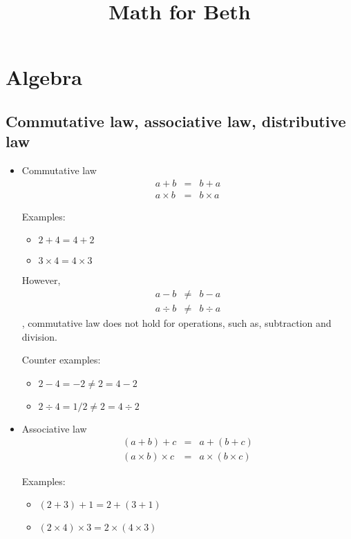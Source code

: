 \documentclass[12pt]{article}   	%
\title{Math for Beth}
\begin{document}
\maketitle



\section{Algebra}

\subsection{Commutative law, associative law, distributive law}

\begin{itemize}
\item Commutative law
\begin{eqnarray*}
a + b &=& b + a
\\
a \times b &=& b \times a
\end{eqnarray*}

Examples:
\begin{itemize}
\item $2 + 4 = 4 + 2$
\item $3 \times 4 = 4 \times 3$
\end{itemize}

However,
\begin{eqnarray*}
a - b &\neq& b - a
\\
a \div b &\neq& b \div a
\end{eqnarray*}
\ie, commutative law does not hold for operations, such as, subtraction and division.

Counter examples:
\begin{itemize}
\item $ 2 - 4 = -2 \neq 2 = 4 - 2 $
\item $2 \div 4 = 1/2 \neq 2 = 4 \div 2$
\end{itemize}


\item Associative law
\begin{eqnarray*}
(a + b) + c  &=&  a + (b + c)
\\
(a \times b) \times c  &=&  a \times (b \times c)
\end{eqnarray*}

Examples:
\begin{itemize}
    \item $(2 + 3) + 1  =  2 + (3 + 1)$
    \item $(2 \times 4) \times 3  =  2 \times (4 \times 3)$
\end{itemize}


\end{itemize}
\end{document}
